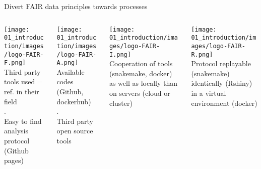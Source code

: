 \begin{frame}{Divert FAIR data principles towards processes}
\begin{columns}[t]
  \begin{column}{.25\textwidth}
      \begin{center}
      \texttt{[image: 01\_introduction/images/logo-FAIR-F.png]}\\Third party tools used = ref. in their field\\.\\Easy to find analysis protocol (Github pages)
      \end{center}
  \end{column}
  \begin{column}{.25\textwidth}
      \begin{center}
      \texttt{[image: 01\_introduction/images/logo-FAIR-A.png]}\\Available codes (Github, dockerhub)\\.\\Third party open source tools
      \end{center}
  \end{column}
  \begin{column}{.25\textwidth}
     \begin{center}
     \texttt{[image: 01\_introduction/images/logo-FAIR-I.png]}\\Cooperation of tools (snakemake, docker) as well as locally than on servers (cloud or cluster)
     \end{center}
  \end{column}
  \begin{column}{.25\textwidth}
     \begin{center}
     \texttt{[image: 01\_introduction/images/logo-FAIR-R.png]}\\Protocol replayable (snakemake) identically (Rshiny) in a virtual environment (docker)
     \end{center}
  \end{column}
\end{columns}
\end{frame}
